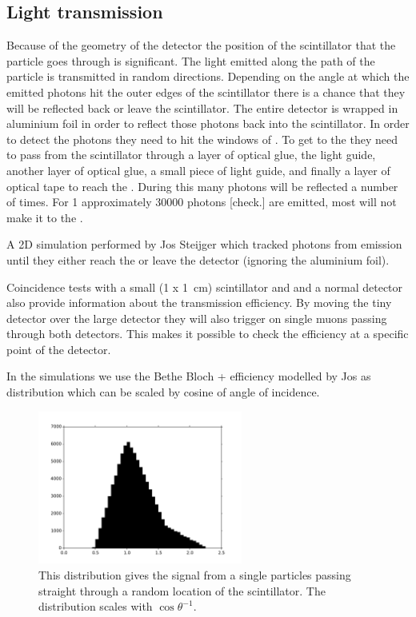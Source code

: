 \subsection{Light transmission}

Because of the geometry of the detector the position of the scintillator
that the particle goes through is significant. The light emitted along
the path of the particle is transmitted in random directions. Depending
on the angle at which the emitted photons hit the outer edges of the
scintillator there is a chance that they will be reflected back or leave
the scintillator. The entire detector is wrapped in aluminium foil in
order to reflect those photons back into the scintillator. In order to
detect the photons they need to hit the windows of \pmt. To get to the
\pmt they need to pass from the scintillator through a layer of optical
glue, the light guide, another layer of optical glue, a small piece of
light guide, and finally a layer of optical tape to reach the \pmt.
During this many photons will be reflected a number of times. For
\SI{1}{\mip} approximately 30000 photons [check.] are emitted, most will
not make it to the \pmt.

A 2D simulation performed by Jos Steijger which tracked photons from
emission until they either reach the \pmt or leave the detector
(ignoring the aluminium foil).

Coincidence tests with a small (\SI[product-units = repeat]{1 x
1}{\centi\meter}) scintillator and \pmt and a normal \hisparc detector
also provide information about the transmission efficiency. By moving
the tiny detector over the large detector they will also trigger on
single muons passing through both detectors. This makes it possible to
check the efficiency at a specific point of the detector.

In the simulations we use the Bethe Bloch + efficiency modelled by Jos
as distribution which can be scaled by cosine of angle of incidence.

\begin{figure}
    \centering
    \includegraphics[width=0.6\textwidth]{plots/response/signal_efficiency.pdf}
    \caption{ This distribution gives
             the signal from a single particles passing straight through
             a random location of the scintillator. The distribution
             scales with $\cos{\theta}^{-1}$.}
    \label{fig:signal_efficiency}
\end{figure}


